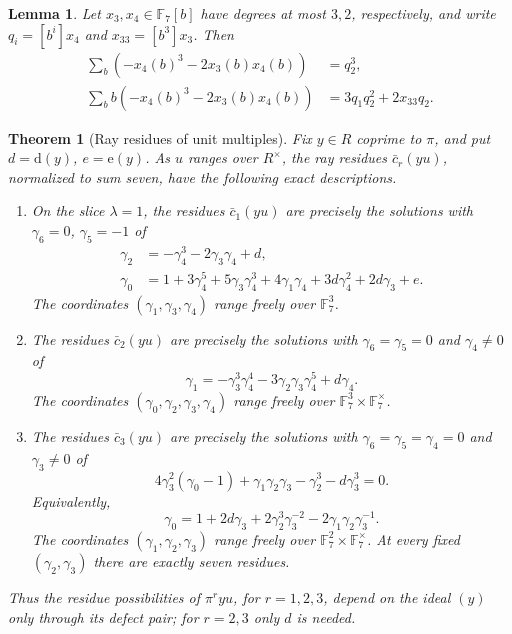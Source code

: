 \documentclass[10pt,a4paper]{amsart}
\newtheorem{lemma}{Lemma}
\newtheorem{theorem}{Theorem}
\newcommand{\F}{\mathbb F}
\newcommand{\dd}{\mathrm d}
\newcommand{\ee}{\mathrm e}
\begin{document}
\begin{lemma}\label{lem:identity}
Let $x_3,x_4\in\F_7[b]$ have degrees at most $3,2$, respectively,
and write $q_i=[b^i]x_4$ and $x_{33}=[b^3]x_3$. Then
\begin{align*}
 \sum_b(-x_4(b)^3-2x_3(b)x_4(b))&=q_2^3,\\
 \sum_b b(-x_4(b)^3-2x_3(b)x_4(b))
     &=3q_1q_2^2+2x_{33}q_2.
\end{align*}
\end{lemma}

\begin{theorem}[Ray residues of unit multiples]\label{thm:twisted}
Fix $y\in R$ coprime to $\pi$, and put $d=\dd(y)$, $e=\ee(y)$.
As $u$ ranges over $R^\times$, the ray residues $\bar c_r(yu)$,
normalized to sum seven, have the following exact descriptions.
\begin{enumerate}
\item[(a)] On the slice $\lambda=1$, the residues $\bar c_1(yu)$
are precisely the solutions with $\gamma_6=0$, $\gamma_5=-1$ of
\begin{align*}
 \gamma_2&=-\gamma_4^3-2\gamma_3\gamma_4+d,\\
 \gamma_0&=1+3\gamma_4^5+5\gamma_3\gamma_4^3+4\gamma_1\gamma_4
                  +3d\gamma_4^2+2d\gamma_3+e.
\end{align*}
The coordinates $(\gamma_1,\gamma_3,\gamma_4)$ range freely over $\F_7^3$.
\item[(b)] The residues $\bar c_2(yu)$ are precisely the solutions with
$\gamma_6=\gamma_5=0$ and $\gamma_4\ne0$ of
\[
 \gamma_1=-\gamma_3^3\gamma_4^4
                -3\gamma_2\gamma_3\gamma_4^5+d\gamma_4.
\]
The coordinates $(\gamma_0,\gamma_2,\gamma_3,\gamma_4)$ range freely
over $\F_7^3\times\F_7^\times$.
\item[(c)] The residues $\bar c_3(yu)$ are precisely the solutions with
$\gamma_6=\gamma_5=\gamma_4=0$ and $\gamma_3\ne0$ of
\begin{equation}\label{eq:twisted-third}
 4\gamma_3^2(\gamma_0-1)+\gamma_1\gamma_2\gamma_3
              -\gamma_2^3-d\gamma_3^3=0.
\end{equation}
Equivalently,
\begin{equation}\label{eq:twisted-third-solved}
 \gamma_0=1+2d\gamma_3+2\gamma_2^3\gamma_3^{-2}
                              -2\gamma_1\gamma_2\gamma_3^{-1}.
\end{equation}
The coordinates $(\gamma_1,\gamma_2,\gamma_3)$ range freely over
$\F_7^2\times\F_7^\times$.  At every fixed
$(\gamma_2,\gamma_3)$ there are exactly seven residues.
\end{enumerate}
Thus the residue possibilities of $\pi^ryu$, for $r=1,2,3$, depend on
the ideal $(y)$ only through its defect pair; for $r=2,3$ only $d$ is
needed.
\end{theorem}
\end{document}
